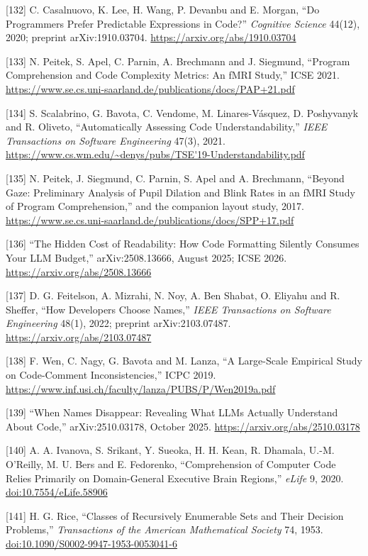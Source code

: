 \documentclass[10pt,letterpaper]{article}
\begin{document}
{[}132{]} C. Casalnuovo, K. Lee, H. Wang, P. Devanbu and E. Morgan, ``Do
Programmers Prefer Predictable Expressions in Code?'' \emph{Cognitive
Science} 44(12), 2020; preprint arXiv:1910.03704.
\url{https://arxiv.org/abs/1910.03704}

{[}133{]} N. Peitek, S. Apel, C. Parnin, A. Brechmann and J. Siegmund,
``Program Comprehension and Code Complexity Metrics: An fMRI Study,''
ICSE 2021.
\url{https://www.se.cs.uni-saarland.de/publications/docs/PAP+21.pdf}

{[}134{]} S. Scalabrino, G. Bavota, C. Vendome, M. Linares-Vásquez, D.
Poshyvanyk and R. Oliveto, ``Automatically Assessing Code
Understandability,'' \emph{IEEE Transactions on Software Engineering}
47(3), 2021.
\url{https://www.cs.wm.edu/~denys/pubs/TSE'19-Understandability.pdf}

{[}135{]} N. Peitek, J. Siegmund, C. Parnin, S. Apel and A. Brechmann,
``Beyond Gaze: Preliminary Analysis of Pupil Dilation and Blink Rates in
an fMRI Study of Program Comprehension,'' and the companion layout
study, 2017.
\url{https://www.se.cs.uni-saarland.de/publications/docs/SPP+17.pdf}

{[}136{]} ``The Hidden Cost of Readability: How Code Formatting Silently
Consumes Your LLM Budget,'' arXiv:2508.13666, August 2025; ICSE 2026.
\url{https://arxiv.org/abs/2508.13666}

{[}137{]} D. G. Feitelson, A. Mizrahi, N. Noy, A. Ben Shabat, O. Eliyahu
and R. Sheffer, ``How Developers Choose Names,'' \emph{IEEE Transactions
on Software Engineering} 48(1), 2022; preprint arXiv:2103.07487.
\url{https://arxiv.org/abs/2103.07487}

{[}138{]} F. Wen, C. Nagy, G. Bavota and M. Lanza, ``A Large-Scale
Empirical Study on Code-Comment Inconsistencies,'' ICPC 2019.
\url{https://www.inf.usi.ch/faculty/lanza/PUBS/P/Wen2019a.pdf}

{[}139{]} ``When Names Disappear: Revealing What LLMs Actually
Understand About Code,'' arXiv:2510.03178, October 2025.
\url{https://arxiv.org/abs/2510.03178}

{[}140{]} A. A. Ivanova, S. Srikant, Y. Sueoka, H. H. Kean, R. Dhamala,
U.-M. O'Reilly, M. U. Bers and E. Fedorenko, ``Comprehension of Computer
Code Relies Primarily on Domain-General Executive Brain Regions,''
\emph{eLife} 9, 2020.
\href{https://doi.org/10.7554/eLife.58906}{doi:10.7554/eLife.58906}

{[}141{]} H. G. Rice, ``Classes of Recursively Enumerable Sets and Their
Decision Problems,'' \emph{Transactions of the American Mathematical
Society} 74, 1953.
\href{https://doi.org/10.1090/S0002-9947-1953-0053041-6}{doi:10.1090/S0002-9947-1953-0053041-6}
\end{document}
